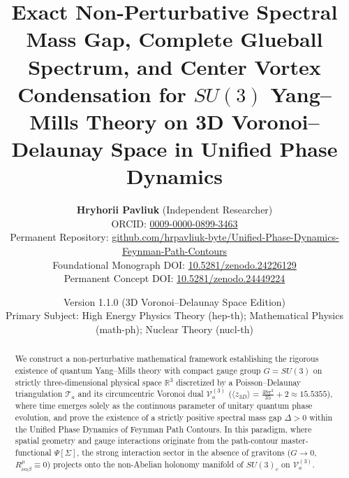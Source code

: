 \documentclass[11pt, a4paper]{article}
\title{\textbf{Exact Non-Perturbative Spectral Mass Gap, Complete Glueball Spectrum, and Center Vortex Condensation for $SU(3)$ Yang--Mills Theory on 3D Voronoi--Delaunay Space in Unified Phase Dynamics}}
\author{
  \textbf{Hryhorii Pavliuk} (Independent Researcher) \\
\small ORCID: \href{https://orcid.org/0009-0000-0899-3463}{0009-0000-0899-3463} \\
  Permanent Repository: \href{https://github.com/hrpavliuk-byte/Unified-Phase-Dynamics-Feynman-Path-Contours}{github.com/hrpavliuk-byte/Unified-Phase-Dynamics-Feynman-Path-Contours} \\
  Foundational Monograph DOI: \href{https://doi.org/10.5281/zenodo.24226129}{10.5281/zenodo.24226129} \\
  Permanent Concept DOI: \href{https://doi.org/10.5281/zenodo.24449224}{10.5281/zenodo.24449224}
}
\date{Version 1.1.0 (3D Voronoi--Delaunay Space Edition) \\ \small Primary Subject: High Energy Physics Theory (hep-th); Mathematical Physics (math-ph); Nuclear Theory (nucl-th)}
\theoremstyle{definition}
\theoremstyle{remark}
\begin{document}
\maketitle

\begin{abstract}
We construct a non-perturbative mathematical framework establishing the rigorous existence of quantum Yang--Mills theory with compact gauge group $G = SU(3)$ on strictly three-dimensional physical space $\mathbb{R}^{3}$ discretized by a Poisson--Delaunay triangulation $\mathcal{T}_{a}$ and its circumcentric Voronoi dual $\mathcal{V}_{a}^{(3)}$ ($\langle z_{3D} \rangle = \frac{48\pi^{2}}{35} + 2 \approx 15.5355$), where time emerges solely as the continuous parameter of unitary quantum phase evolution, and prove the existence of a strictly positive spectral mass gap $\Delta > 0$ within the Unified Phase Dynamics of Feynman Path Contours. In this paradigm, where spatial geometry and gauge interactions originate from the path-contour master-functional $\Psi[\Sigma]$, the strong interaction sector in the absence of gravitons ($G \to 0$, $R^{\mu}_{\nu\alpha\beta} \equiv 0$) projects onto the non-Abelian holonomy manifold of $SU(3)_{c}$ on $\mathcal{V}_{a}^{(3)}$.


\end{abstract}
\end{document}
